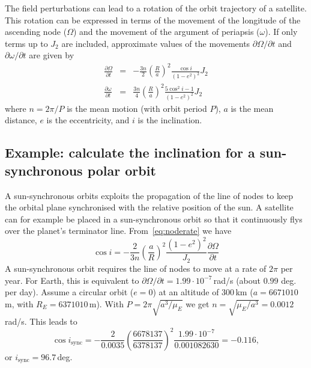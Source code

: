 \documentclass[a4paper]{article}
\begin{document}
The field perturbations can lead to a rotation of the orbit trajectory of a satellite. This rotation can be expressed in terms of the movement of the longitude of the ascending node ($\Omega$) and the movement of the argument of periapsis ($\omega$).
If only terms up to $J_2$ are included, approximate values of the movements $\partial\Omega/\partial t$ and $\partial\omega/\partial t$ are given by
\begin{eqnarray}
\frac{\partial\Omega}{\partial t} &=& -\frac{3 n}{2} \left(\frac{R}{a}\right)^2 \frac{\cos i}{(1-e^2)^2} J_2 \label{eq:noderate} \\
\frac{\partial\omega}{\partial t} &=& \frac{3 n}{4} \left(\frac{R}{a}\right)^2 \frac{5 \cos^2 i - 1}{(1-e^2)^2} J_2
\end{eqnarray}
where $n=2\pi/P$ is the mean motion (with orbit period $P$), $a$ is the mean distance, $e$ is the eccentricity, and $i$ is the inclination.

\subsection*{Example: calculate the inclination for a sun-synchronous polar orbit}
A sun-synchronous orbits exploits the propagation of the line of nodes to keep the orbital plane synchronised with the relative position of the sun. A satellite can for example be placed in a sun-synchronous orbit so that it continuously flys over the planet's terminator line.
From~\ref{eq:noderate} we have
\begin{equation}
\cos i = -\frac{2}{3 n} \left(\frac{a}{R} \right)^2 \frac{(1-e^2)^2}{J_2} \frac{\partial\Omega}{\partial t}
\end{equation}
A sun-synchronous orbit requires the line of nodes to move at a rate of $2\pi$ per year. For Earth, this is equivalent to $\partial\Omega/\partial t = 1.99\cdot 10^{-7}$\,rad/s (about $0.99$ deg. per day). Assume a circular orbit ($e=0$) at an altitude of 300\,km
($a = 6 671 010$\,m, with $R_E = 6 371 010$\,m).
With $P = 2\pi\sqrt{a^3/\mu_E}$ we get $n = \sqrt{\mu_E/a^3} = 0.0012$\,rad/s. This leads to
\begin{equation}
\cos i_\text{sync} = -\frac{2}{0.0035} \left(\frac{6 678 137}{6 378 137}\right)^2 \frac{1.99\cdot 10^{-7}}{0.001082630} = -0.116,
\end{equation}
or $i_\text{sync} = 96.7$\,deg.
\end{document}
